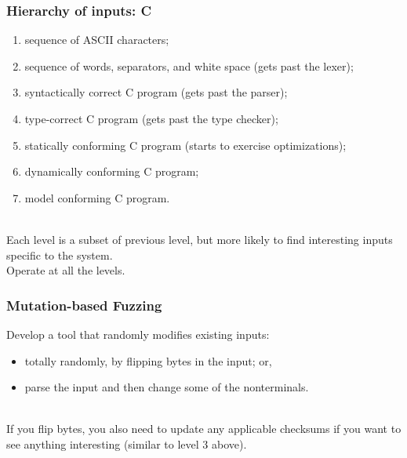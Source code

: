 \documentclass{beamer}
\newenvironment{changemargin}[1]{%
  \begin{list}{}{%
    \setlength{\topsep}{0pt}%
    \setlength{\leftmargin}{#1}%
    \setlength{\rightmargin}{1em}
    \setlength{\listparindent}{\parindent}%
    \setlength{\itemindent}{\parindent}%
    \setlength{\parsep}{\parskip}%
  }%
  \item[]}{\end{list}}
\begin{document}
\begin{frame}
  \frametitle{Hierarchy of inputs: C}
  \begin{changemargin}{1em}
\begin{enumerate}
\item sequence of ASCII characters;
\item sequence of words, separators, and white space (gets past the lexer);
\item syntactically correct C program (gets past the parser);
\item type-correct C program (gets past the type checker);
\item statically conforming C program (starts to exercise optimizations);
\item dynamically conforming C program;
\item model conforming C program.
\end{enumerate}
~\\[1em]
Each level is a subset of previous level, but more likely to find interesting inputs specific to the system.\\[1em]
Operate at all the levels.
  \end{changemargin}
\end{frame}

\begin{frame}
  \frametitle{Mutation-based Fuzzing}

  \begin{changemargin}{2em}
    \Large
Develop a tool that randomly modifies existing
inputs:
\begin{itemize}
  \item totally randomly, by flipping bytes in the input; or,
  \item parse the input and then change some of the nonterminals.
\end{itemize}
~\\
If you flip bytes, you also need to update any applicable
checksums if you want to see anything interesting (similar to
level 3 above).
  \end{changemargin}
\end{frame}
\end{document}
